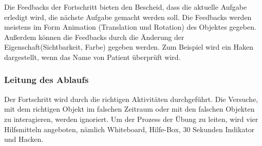   Die Feedbacks der Fortschritt bieten den Bescheid, dass die aktuelle Aufgabe erledigt wird, die nächste Aufgabe gemacht werden soll. Die Feedbacks werden meistens im Form Animation (Translation und Rotation) des Objektes gegeben. Außerdem können die Feedbacks durch die Änderung der Eigenschaft(Sichtbarkeit, Farbe) gegeben werden. Zum Beispiel wird ein Haken dargestellt, wenn das Name von Patient überprüft wird.
  
  \subsubsection{Leitung des Ablaufs}
  Der Fortschritt wird durch die richtigen Aktivitäten durchgeführt. Die Versuche, mit dem richtigen Objekt im falschen Zeitraum oder mit den falschen Objekten zu interagieren, werden ignoriert. Um der Prozess der Übung zu leiten, wird vier Hilfsmitteln angeboten, nämlich Whiteboard, Hilfe-Box, 30 Sekunden Indikator und Hacken.
